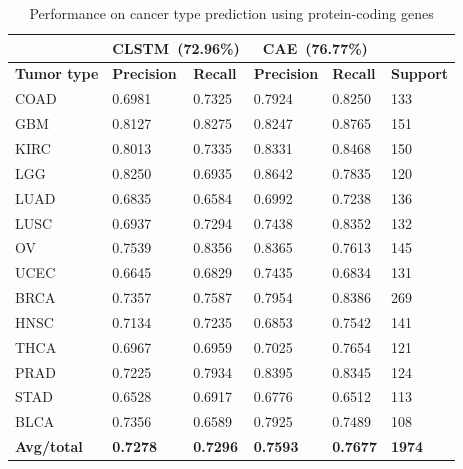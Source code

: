\begin{table} [h]
\caption{Performance on cancer type prediction using protein-coding genes}
\label{table:codingene} %
    \begin{center}
        \vspace{-5mm}
    \scriptsize
        \begin{tabular}{l|ll|ll|l}
        \hline
        \rowcolor{Gray}
        {} & \multicolumn{2}{c}{\textbf{CLSTM~(72.96\%)}} & \multicolumn{2}{c}{\textbf{CAE~(76.77\%)}} &  {} \\\hline
        \textbf{Tumor type} & \textbf{Precision} &  \textbf{Recall}  & \textbf{Precision} &  \textbf{Recall} & \textbf{Support} \\\hline
        COAD    & 0.6981  &  0.7325 & 0.7924 &    0.8250 & 133  \\\hline
        GBM     & 0.8127  &  0.8275 & 0.8247 &   0.8765  & 151  \\\hline
        KIRC    & 0.8013  &  0.7335 & 0.8331 &   0.8468  & 150  \\\hline
        LGG     & 0.8250  &  0.6935 & 0.8642 &   0.7835 & 120  \\\hline
        LUAD    & 0.6835  &  0.6584 & 0.6992 &   0.7238 & 136  \\\hline
        LUSC    & 0.6937  &  0.7294 & 0.7438 &   0.8352 & 132  \\\hline
        OV      & 0.7539  &  0.8356 & 0.8365 &   0.7613 & 145  \\\hline
        UCEC    & 0.6645  &  0.6829 & 0.7435 &   0.6834 & 131  \\\hline
        BRCA    & 0.7357  &  0.7587 & 0.7954 &   0.8386 & 269  \\\hline
        HNSC    & 0.7134  &  0.7235 & 0.6853 &   0.7542 & 141  \\\hline
        THCA    & 0.6967 &  0.6959 & 0.7025 &   0.7654 & 121  \\\hline
        PRAD    & 0.7225  &  0.7934 & 0.8395 &   0.8345 & 124  \\\hline
        STAD    & 0.6528  &  0.6917 & 0.6776 &   0.6512 & 113  \\\hline
        BLCA    & 0.7356  &  0.6589 & 0.7925 &   0.7489 & 108  \\\hline
        \rowcolor{LightCyan}
        \textbf{Avg/total} & \textbf{0.7278} &    \textbf{0.7296} & \textbf{0.7593} &    \textbf{0.7677} & \textbf{1974}  \\\hline
        \end{tabular}
        \vspace{-4mm}
    \end{center}
\end{table}

